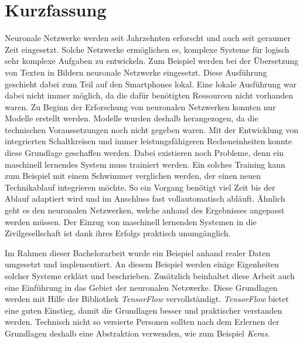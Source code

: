 \chapter{Kurzfassung}

Neuronale Netzwerke werden seit Jahrzehnten erforscht und auch seit geraumer Zeit eingesetzt. 
Solche Netzwerke ermöglichen es, komplexe Systeme für logisch sehr komplexe Aufgaben zu entwickeln. 
Zum Beispiel werden bei der Übersetzung von Texten in Bildern neuronale Netzwerke eingesetzt. 
Diese Ausführung geschieht dabei zum Teil auf den Smartphones lokal. 
Eine lokale Ausführung war dabei nicht immer möglich, da die dafür benötigten Ressourcen nicht vorhanden waren. 
Zu Beginn der Erforschung von neuronalen Netzwerken konnten nur Modelle erstellt werden. 
Modelle wurden deshalb herangezogen, da die technischen Voraussetzungen noch nicht gegeben waren. 
Mit der Entwicklung von integrierten Schaltkreisen und immer leistungsfähigeren Recheneinheiten konnte diese Grundlage geschaffen werden. 
Dabei existieren noch Probleme, denn ein maschinell lernendes System muss trainiert werden. 
Ein solches Training kann zum Beispiel mit einem Schwimmer verglichen werden, der einen neuen Technikablauf integrieren möchte. 
So ein Vorgang benötigt viel Zeit bis der Ablauf adaptiert wird und im Anschluss fast vollautomatisch abläuft. 
Ähnlich geht es den neuronalen Netzwerken, welche anhand des Ergebnisses angepasst werden müssen. 
Der Einzug von maschinell lernenden Systemen in die Zivilgesellschaft ist dank ihres Erfolgs praktisch unumgänglich. 

\noindent
Im Rahmen dieser Bachelorarbeit wurde ein Beispiel anhand realer Daten umgesetzt und implementiert. 
An diesem Beispiel werden einige Eigenheiten solcher Systeme erklärt und beschrieben. 
Zusätzlich beinhaltet diese Arbeit auch eine Einführung in das Gebiet der neuronalen Netzwerke. 
Diese Grundlagen werden mit Hilfe der Bibliothek \textit{TensorFlow} vervollständigt. 
\textit{TensorFlow} bietet eine guten Einstieg, damit die Grundlagen besser und praktischer verstanden werden. 
Technisch nicht so versierte Personen sollten nach dem Erlernen der Grundlagen deshalb eine Abstraktion verwenden, wie zum Beispiel \textit{Keras}. 
